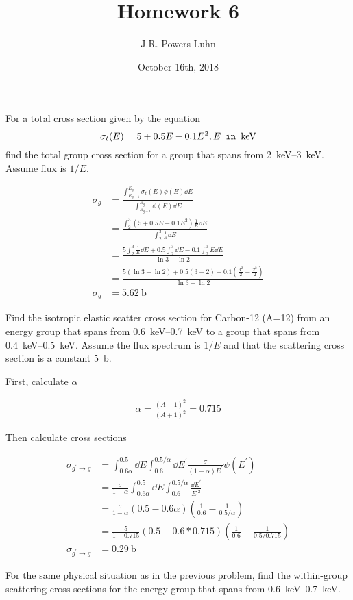 \documentclass{hw}
\title{Homework 6}
\author{J.R. Powers-Luhn}
\date{October 16th, 2018}
\begin{document}
\problem{}
For a total cross section given by the equation $$\sigma_t(E) = 5 + 0.5E - 0.1 E^2, E\texttt{ in \si{\kilo\electronvolt}}$$ find the total group cross section for a group that spans from \SIrange{2}{3}{\kilo\electronvolt}. Assume flux is $1/E$.

\solution
\begin{align*}
\sigma_g  &= \frac{\int_{E_{g-1}}^{E_g} \sigma_t(E) \phi (E) \dd{E}}{\int_{E_{g-1}}^{E_g} \phi (E) \dd{E}} \\
&= \frac{\int_2^3 (5+0.5E-0.1E^2) \frac{1}{E}\dd{E}}{\int_2^3 \frac{1}{E} \dd{E}} \\
&= \frac{5 \int_2^3 \frac{1}{E} \dd{E} + 0.5 \int_2^3 \dd{E} -0.1 \int_2^3 E \dd{E}}{\ln{3}-\ln{2}} \\
&= \frac{5 (\ln{3}-\ln{2}) + 0.5(3-2) - 0.1(\frac{3^2}{2} - \frac{2^2}{2})}{\ln{3}-\ln{2}} \\
\sigma_g &= \SI{5.62}{\barn}
\end{align*}

\problem{}
Find the isotropic elastic scatter cross section for Carbon-12 (A=12) from an energy group that spans from \SIrange{0.6}{0.7}{\kilo\electronvolt} to a group that spans from \SIrange{0.4}{0.5}{\kilo\electronvolt}. Assume the flux spectrum is $1/E$ and that the scattering cross section is a constant \SI{5}{\barn}.

\solution
First, calculate $\alpha$

\begin{align*}
\alpha = \frac{(A-1)^2}{(A+1)^2} = 0.715
\end{align*}

Then calculate cross sections

\begin{align*}
\sigma_{g^\prime\rightarrow g} &= \int_{0.6 \alpha}^{0.5} \dd{E} \int_{0.6}^{0.5 / \alpha} \dd{E^\prime} \frac{\sigma}{(1 - \alpha) E^\prime}\psi(E^\prime) \\
&= \frac{\sigma}{1-\alpha} \int_{0.6 \alpha}^{0.5} \dd{E} \int_{0.6}^{0.5 / \alpha} \frac{\dd{E^\prime}}{E^{\prime2}} \\
&= \frac{\sigma}{1-\alpha} (0.5 - 0.6\alpha) (\frac{1}{0.6} - \frac{1}{0.5 / \alpha}) \\
&= \frac{5}{1-0.715} (0.5 - 0.6*0.715) (\frac{1}{0.6} - \frac{1}{0.5 / 0.715}) \\
\sigma_{g^\prime\rightarrow g} &= \SI{0.29}{\barn}
\end{align*}

\problem{}
For the same physical situation as in the previous problem, find the within-group scattering cross sections for the energy group that spans from \SIrange{0.6}{0.7}{\kilo\electronvolt}.
\end{document}
